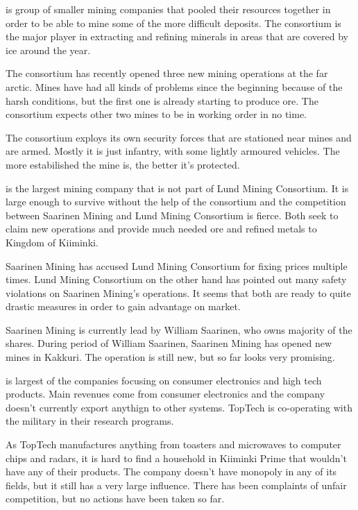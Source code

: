 \documentclass{tufte-book}
\begin{document}
 is group of smaller mining companies that
pooled their resources together in order to be able to mine some of the
more difficult deposits. The consortium is the major player in extracting and
refining minerals in areas that are covered by ice around the year.

The consortium has recently opened three new mining operations at the far
arctic. Mines have had all kinds of problems since the beginning because of
the harsh conditions, but the first one is already starting to produce ore.
The consortium expects other two mines to be in working order in no time.

The consortium exploys its own security forces that are stationed near mines
and are armed. Mostly it is just infantry, with some lightly armoured
vehicles. The more estabilished the mine is, the better it's protected.

 is the largest mining company that is not part of
Lund Mining Consortium. It is large enough to survive without the help of the
consortium and the competition between Saarinen Mining and Lund Mining
Consortium is fierce. Both seek to claim new operations and provide much
needed ore and refined metals to Kingdom of Kiiminki.

Saarinen Mining has accused Lund Mining Consortium for fixing prices multiple
times. Lund Mining Consortium on the other hand has pointed out many safety
violations on Saarinen Mining's operations. It seems that both are ready to
quite drastic measures in order to gain advantage on market.

Saarinen Mining is currently lead by William Saarinen, who owns majority of
the shares. During period of William Saarinen, Saarinen Mining has opened new
mines in Kakkuri. The operation is still new, but so far looks very promising.

 is largest of the companies focusing on consumer
electronics and high tech products. Main revenues come from consumer
electronics and the company doesn't currently export anythign to other
systems. TopTech is co-operating with the military in their research
programs.

As TopTech manufactures anything from toasters and microwaves to computer
chips and radars, it is hard to find a household in Kiiminki Prime that
wouldn't have any of their products. The company doesn't have monopoly in any
of its fields, but it still has a very large influence. There has been
complaints of unfair competition, but no actions have been taken so far.
\end{document}
